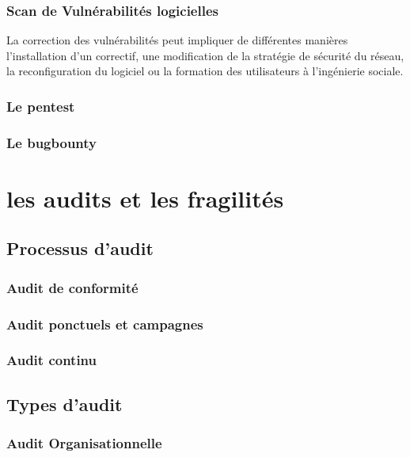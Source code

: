 \subsubsection{Scan de Vulnérabilités logicielles}

La correction des vulnérabilités peut impliquer de différentes manières l’installation d’un correctif, une modification de la stratégie de sécurité du réseau, la reconfiguration du logiciel ou la formation des utilisateurs à l’ingénierie sociale.

\subsubsection{Le pentest}

\subsubsection{Le bugbounty}


\section{les audits et les fragilités}

\subsection{Processus d'audit}
\subsubsection{Audit de conformité}
\subsubsection{Audit ponctuels et campagnes}
\subsubsection{Audit continu}



\subsection{Types d'audit}
\subsubsection{Audit Organisationnelle}
